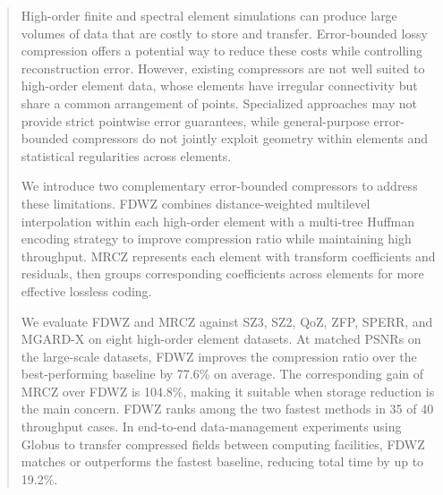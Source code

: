 \begin{abstract}

High-order finite and spectral element simulations can produce large volumes of data that are costly to store and transfer. Error-bounded lossy compression offers a potential way to reduce these costs while controlling reconstruction error. However, existing compressors are not well suited to high-order element data, whose elements have irregular connectivity but share a common arrangement of points. Specialized approaches may not provide strict pointwise error guarantees, while general-purpose error-bounded compressors do not jointly exploit geometry within elements and statistical regularities across elements.

We introduce two complementary error-bounded compressors to address these limitations. FDWZ combines distance-weighted multilevel interpolation within each high-order element with a multi-tree Huffman encoding strategy to improve compression ratio while maintaining high throughput. MRCZ represents each element with transform coefficients and residuals, then groups corresponding coefficients across elements for more effective lossless coding.

We evaluate FDWZ and MRCZ against SZ3, SZ2, QoZ, ZFP, SPERR, and MGARD-X on eight high-order element datasets. At matched PSNRs on the large-scale datasets, FDWZ improves the compression ratio over the best-performing baseline by 77.6\% on average. The corresponding gain of MRCZ over FDWZ is 104.8\%, making it suitable when storage reduction is the main concern. FDWZ ranks among the two fastest methods in 35 of 40 throughput cases. In end-to-end data-management experiments using Globus to transfer compressed fields between computing facilities, FDWZ matches or outperforms the fastest baseline, reducing total time by up to 19.2\%.

\end{abstract}

